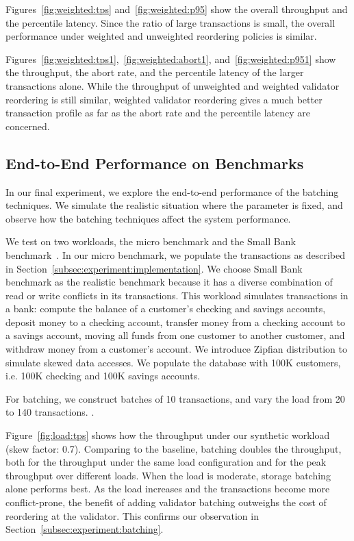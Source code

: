 Figures~\ref{fig:weighted:tps} and~\ref{fig:weighted:p95} show the overall throughput and the percentile latency. Since the ratio of large transactions is small, the overall performance under weighted and unweighted reordering policies is similar.

Figures~\ref{fig:weighted:tps1},~\ref{fig:weighted:abort1}, and~\ref{fig:weighted:p951} show the throughput, the abort rate, and the percentile latency of the larger transactions alone. While the throughput of unweighted and weighted validator reordering is still similar, weighted validator reordering gives a much better transaction profile as far as the abort rate and the percentile latency are concerned.

\subsection{End-to-End Performance on Benchmarks}
\label{subsec:experiment:end2end}
In our final experiment, we explore the end-to-end performance of the batching techniques. We simulate the realistic situation where the parameter is fixed, and observe how the batching techniques affect the system performance.

We test on two workloads, the micro benchmark and the Small Bank benchmark~\cite{alomari2008icde}. In our micro benchmark,  we populate the transactions as described in Section~\ref{subsec:experiment:implementation}.  We choose Small Bank benchmark as the realistic benchmark because it has a diverse combination of read or write conflicts in its transactions. This workload simulates transactions in a bank: compute the balance of a customer's checking and savings accounts, deposit money to a checking account, transfer money from a checking account to a savings account, moving all funds from one customer to another customer, and withdraw money from a customer's account. We introduce Zipfian distribution to simulate skewed data accesses. We populate the database with 100K customers, i.e. 100K checking and 100K savings accounts.

For batching, we construct batches of 10 transactions, and vary the load from 20 to 140 transactions. .

Figure~\ref{fig:load:tps} shows how the throughput under our synthetic workload (skew factor: 0.7). Comparing to the baseline, batching doubles the throughput, both for the throughput under the same load configuration and for the peak throughput over different loads. 
When the load is moderate, storage batching alone performs best. As the load increases and the transactions become more conflict-prone, the benefit of adding validator batching outweighs the cost of reordering at the validator. This confirms our observation in Section~\ref{subsec:experiment:batching}. 

